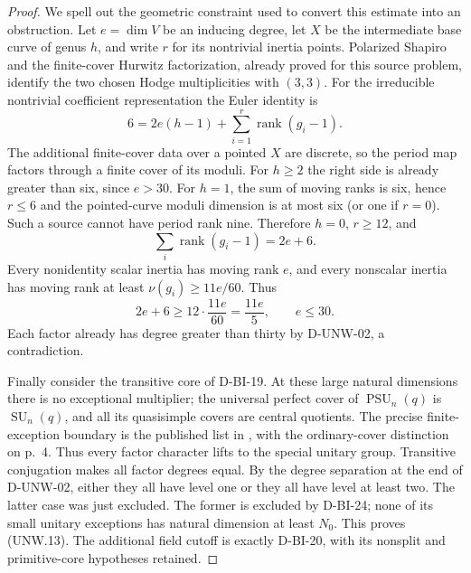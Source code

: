 \begin{proof}
We spell out the geometric constraint used to convert this
estimate into an obstruction.  Let $e=\dim V$ be an inducing
degree, let $X$ be the intermediate base curve of genus $h$,
and write $r$ for its nontrivial inertia points.  Polarized
Shapiro and the finite-cover Hurwitz factorization, already
proved for this source problem, identify the two chosen Hodge
multiplicities with $(3,3)$.  For the irreducible nontrivial
coefficient representation the Euler identity is
\[
 6=2e(h-1)+\sum_{i=1}^r\operatorname{rank}(g_i-1).
                                                               \tag{UNW.15}
\]
The additional finite-cover data over a pointed $X$ are discrete,
so the period map factors through a finite cover of its moduli.
For $h\ge2$ the right side is already greater than six, since
$e>30$.  For $h=1$, the sum of moving ranks is six, hence
$r\le6$ and the pointed-curve moduli dimension is at most six
(or one if $r=0$).  Such a source cannot have period rank nine.
Therefore $h=0$, $r\ge12$, and
\[
                  \sum_i\operatorname{rank}(g_i-1)=2e+6.
                                                               \tag{UNW.16}
\]
Every nonidentity scalar inertia has moving rank $e$, and every
nonscalar inertia has moving rank at least $\nu(g_i)\ge11e/60$.
Thus
\[
               2e+6\ge12\cdot\frac{11e}{60}
                  =\frac{11e}{5},\qquad e\le30.
                                                               \tag{UNW.17}
\]
Each factor already has degree greater than thirty by
D-UNW-02, a contradiction.

Finally consider the transitive core of D-BI-19.  At these large
natural dimensions there is no exceptional multiplier; the
universal perfect cover of $\operatorname{PSU}_n(q)$ is
$\operatorname{SU}_n(q)$, and all its quasisimple covers are
central quotients.  The precise finite-exception boundary is
the published list in \cite[Chapter~5, Table~1, p.~35]{BI:HHM},
with the ordinary-cover distinction on p.~4.  Thus every factor
character lifts to the special unitary group.  Transitive
conjugation makes all factor degrees equal.  By the degree
separation at the end of D-UNW-02, either they all have level
one or they all have level at least two.  The latter case was
just excluded.  The former is excluded by D-BI-24; none of
its small unitary exceptions has natural dimension at least
$N_0$.  This proves (UNW.13).  The additional field cutoff is
exactly D-BI-20, with its nonsplit and primitive-core hypotheses
retained.
\end{proof}

